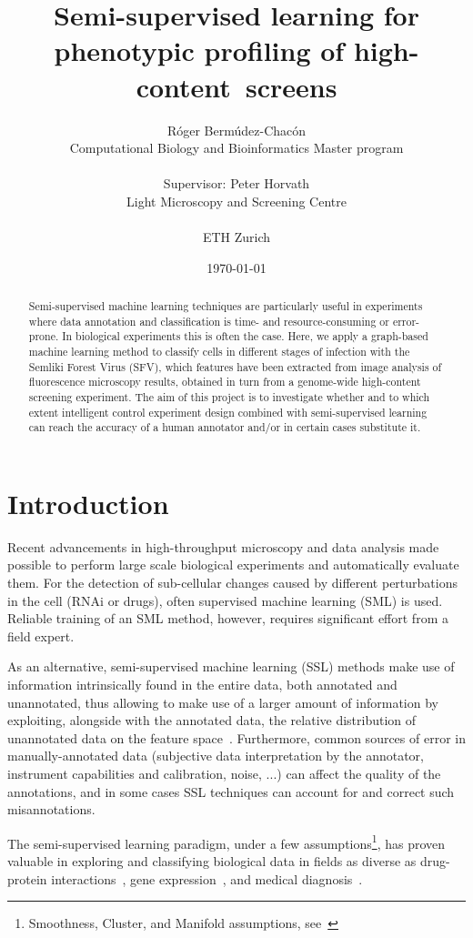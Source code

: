 \documentclass[oneside, a4paper, draft]{memoir} %
\title{
	Semi-supervised learning for phenotypic profiling of \mbox{high-content screens\ifdraft{ (DRAFT)}{\thanks{This
		project was held as a Lab Rotation in Computer Science, as required by the Master program in Computational
		Biology and Bioinformatics - ETH Z\"urich}}}}
\author{
	\ifdraft{Roger Bermudez-Chacon\\Supervisor: Peter Horvath}
	{Róger Bermúdez-Chacón\\\small Computational Biology and Bioinformatics Master program\\\\
			Supervisor: Peter Horvath\\\small Light Microscopy and Screening Centre}\\\\ETH Zurich
}
\date{\today}
\begin{document}
\maketitle
\begin{abstract}
Semi-supervised machine learning techniques are particularly useful in experiments where data annotation and
classification is time- and resource-consuming or error-prone. In biological experiments this is often the case.
Here, we apply a graph-based machine learning method to classify cells in different stages of infection with the
Semliki Forest Virus (SFV), which features have been extracted from image analysis of fluorescence microscopy results,
obtained in turn from a genome-wide high-content screening experiment.
The aim of this project is to investigate whether and to which extent intelligent control experiment design 
combined with semi-supervised learning can reach the accuracy of a human annotator and/or in certain 
cases substitute it.

\end{abstract}
\setcounter{secnumdepth}{0}

\section{Introduction}
Recent advancements in high-throughput microscopy and data analysis made possible to perform large 
scale biological experiments and automatically evaluate them. For the detection of sub-cellular changes 
caused by different perturbations in the cell (RNAi or drugs), often supervised machine learning (SML) 
is used. Reliable training of an SML method, however, requires significant effort from a field expert.

As an alternative, semi-supervised machine learning (SSL) methods make use of information intrinsically found in the 
entire data, both annotated and unannotated, thus allowing to make use of a larger amount of information
by exploiting, alongside with the annotated data, the relative distribution of unannotated data on the feature
space~\cite{chapelle2006semi}. Furthermore, common sources of error in manually-annotated data (subjective data 
interpretation by the annotator, instrument capabilities and calibration, noise, ...) can affect the
quality of the annotations, and in some cases SSL techniques can account for and correct such
misannotations\cite{du2010error}.

The semi-supervised learning paradigm, under a few assumptions\footnote{Smoothness, Cluster, and Manifold assumptions,
see~\cite[p.~4-6]{chapelle2006semi}}, has proven valuable in exploring and classifying biological data in fields as
diverse as drug-protein interactions~\cite{zheng2010semi}, gene expression~\cite{costa2007semi}, and medical
diagnosis~\cite{bair2004semi}.
\end{document}
